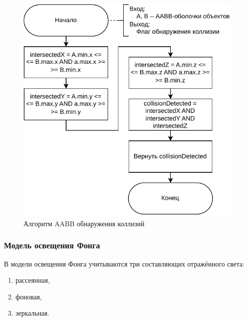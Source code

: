 \begin{figure}[H]
	\centering
	\includegraphics[scale=1]{diag/aabb_tighter.pdf}
	\caption{Алгоритм AABB обнаружения коллизий}
	\label{fig:aabb}
\end{figure}



\subsubsection{Модель освещения Фонга}

В модели освещения Фонга \cite{realphong, phong, rogers} учитываются три составляющих отражённого света:
\begin{enumerate}
    \item рассеянная,
    \item фоновая,
    \item зеркальная.
\end{enumerate}

